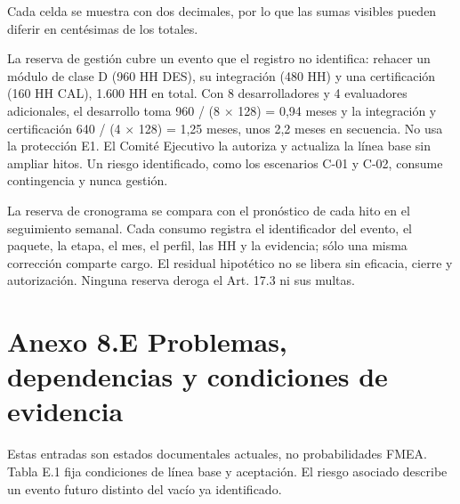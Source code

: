 Cada celda se muestra con dos decimales, por lo que las sumas visibles pueden diferir en centésimas de los totales.

La reserva de gestión cubre un evento que el registro no identifica: rehacer un módulo de clase D (960 HH DES), su integración (480 HH) y una certificación (160 HH CAL), 1.600 HH en total. Con 8 desarrolladores y 4 evaluadores adicionales, el desarrollo toma 960 / (8 \ensuremath{\times} 128) = 0,94 meses y la integración y certificación 640 / (4 \ensuremath{\times} 128) = 1,25 meses, unos 2,2 meses en secuencia. No usa la protección E1. El Comité Ejecutivo la autoriza y actualiza la línea base sin ampliar hitos. Un riesgo identificado, como los escenarios C-01 y C-02, consume contingencia y nunca gestión.

La reserva de cronograma se compara con el pronóstico de cada hito en el seguimiento semanal. Cada consumo registra el identificador del evento, el paquete, la etapa, el mes, el perfil, las HH y la evidencia; sólo una misma corrección comparte cargo. El residual hipotético no se libera sin eficacia, cierre y autorización. Ninguna reserva deroga el Art. 17.3 ni sus multas.

\clearpage
\section*{Anexo 8.E \textemdash{} Problemas, dependencias y condiciones de evidencia}

Estas entradas son estados documentales actuales, no probabilidades FMEA. Tabla E.1 fija condiciones de línea base y aceptación. El riesgo asociado describe un evento futuro distinto del vacío ya identificado.

